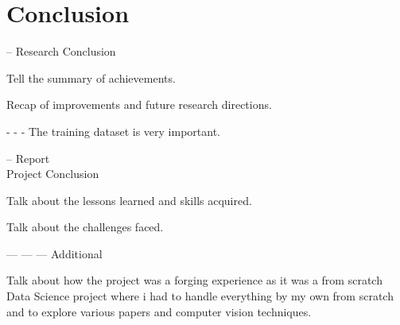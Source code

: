 \section{Conclusion}
-- Research Conclusion

Tell the summary of achievements.

Recap of improvements and future research directions.

- - - The training dataset is very important.

-- Report \\ Project Conclusion

Talk about the lessons learned and skills acquired.

Talk about the challenges faced.

--- --- --- Additional

Talk about how the project was a forging experience as it was a from scratch Data Science project where i had to handle everything by my own from scratch and to explore various papers and computer vision techniques.